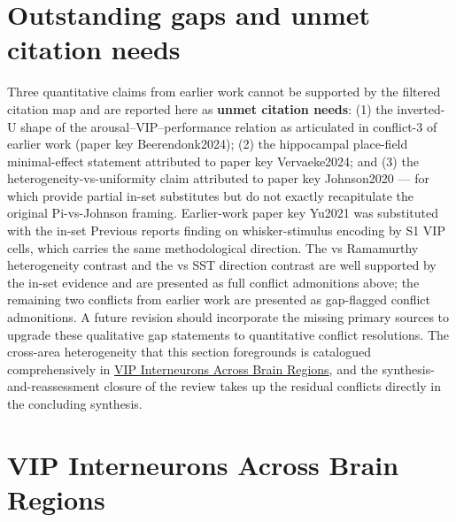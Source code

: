 \documentclass[11pt]{article}
\begin{document}
\section{Outstanding gaps and unmet citation needs}

Three quantitative claims from earlier work cannot be supported by the filtered citation map and are reported here as \textbf{unmet citation needs}: (1) the inverted-U shape of the arousal--VIP--performance relation as articulated in conflict-3 of earlier work (paper key Beerendonk2024); (2) the hippocampal place-field minimal-effect statement attributed to paper key Vervaeke2024; and (3) the heterogeneity-vs-uniformity claim attributed to paper key Johnson2020 --- for which \citet{Ramamurthy2023, Ramamurthy2025, Kannan2022} provide partial in-set substitutes but do not exactly recapitulate the original Pi-vs-Johnson framing. Earlier-work paper key Yu2021 was substituted with the in-set Previous reports \citep{Yu2019} finding on whisker-stimulus encoding by S1 VIP cells, which carries the same methodological direction. The \citet{Pi2013} vs Ramamurthy heterogeneity contrast and the \citet{Fu2014} vs \citet{Pakan2016} SST direction contrast are well supported by the in-set evidence and are presented as full conflict admonitions above; the remaining two conflicts from earlier work are presented as gap-flagged conflict admonitions. A future revision should incorporate the missing primary sources to upgrade these qualitative gap statements to quantitative conflict resolutions. The cross-area heterogeneity that this section foregrounds is catalogued comprehensively in \href{/cross-areas}{VIP Interneurons Across Brain Regions}, and the synthesis-and-reassessment closure of the review takes up the residual conflicts directly in the concluding synthesis.


\section{VIP Interneurons Across Brain Regions}
\label{sec:09_cross_areas}
\end{document}
